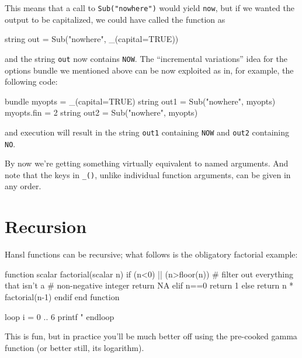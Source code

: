This means that a call to \texttt{Sub("nowhere")} would yield
\texttt{now}, but if we wanted the output to be capitalized, we could
have called the function as
\begin{code}
  string out = Sub("nowhere", _(capital=TRUE))
\end{code}
and the string \texttt{out} now contains \texttt{NOW}.  The
``incremental variations'' idea for the options bundle we mentioned
above can be now exploited as in, for example, the following code:
\begin{code}
  bundle myopts = _(capital=TRUE)
  string out1 = Sub("nowhere", myopts)
  myopts.fin = 2
  string out2 = Sub("nowhere", myopts)
\end{code}
and execution will result in the string \texttt{out1} containing
\texttt{NOW} and \texttt{out2} containing \texttt{NO}.

By now we're getting something virtually equivalent to named
arguments. And note that the keys in \verb|_()|, unlike individual
function arguments, can be given in any order.

\section{Recursion}

Hansl functions can be recursive; what follows is the obligatory
factorial example:
\begin{code}
function scalar factorial(scalar n)
    if (n<0) || (n>floor(n))
        # filter out everything that isn't a
        # non-negative integer
        return NA
    elif n==0
        return 1
    else
        return n * factorial(n-1)
    endif
end function

loop i = 0 .. 6
    printf "%
endloop
\end{code}

This is fun, but in practice you'll be much better off using the
pre-cooked gamma function (or better still, its logarithm).

